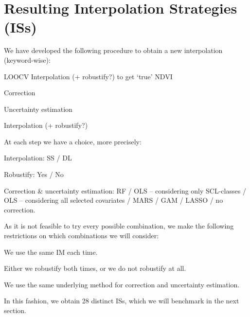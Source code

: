 \section{Resulting Interpolation Strategies ({{IS}}s)}{
    \label{sec:corr_itpl_stat}
    We have developed the following procedure to obtain a new interpolation (keyword-wise):
    \begin{Nenumerate}
        \item LOOCV Interpolation (+ robustify?) to get `true' NDVI
        \item Correction 
        \item Uncertainty estimation
        \item Interpolation (+ robustify?)
    \end{Nenumerate}
    At each step we have a choice, more precisely:
    \begin{Nitemize}
        \item Interpolation: SS / DL
        \item Robustify: Yes / No
        \item Correction \& uncertainty estimation: RF / OLS -- considering only SCL-classes / OLS -- considering all selected covariates / MARS / GAM / LASSO / no correction.
    \end{Nitemize}
    As it is not feasible to try every possible combination, we make the following restrictions on which combinations we will consider:
    \begin{Nitemize}
        \item We use the same {{IM}} each time.
        \item Either we robustify both times, or we do not robustify at all.
        \item We use the same underlying method for correction and uncertainty estimation.
    \end{Nitemize}

    In this fashion, we obtain 28 distinct {{IS}}s, which we will benchmark in the next section.
}


